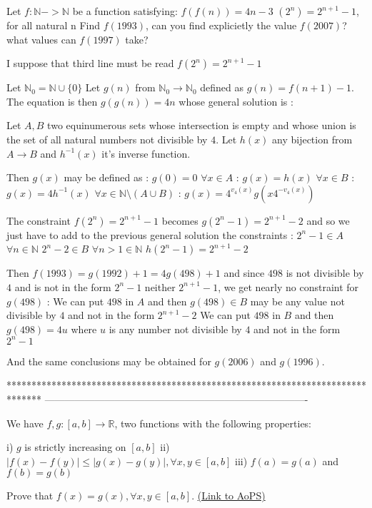 \begin{solution}
	\begin{tcolorbox}Let $f:\mathbb{N}->\mathbb{N}$ be a function satisfying:
 $f(f(n))=4n-3$
 $(2^n)=2^{n+1}-1$, for all natural n
Find $ f(1993)$, can you find explicietly the value $ f(2007)$? what values can $f(1997)$ take?\end{tcolorbox}
I suppose that third line must be read $f(2^n)=2^{n+1}-1$

Let $\mathbb N_0=\mathbb N\cup\{0\}$
Let $g(n)$ from $\mathbb N_0\to\mathbb N_0$ defined as $g(n)=f(n+1)-1$. The equation is then $g(g(n))=4n$ whose general solution is :

Let $A,B$ two equinumerous sets whose intersection is empty and whose union is the set of all natural numbers not divisible by $4$.
Let $h(x)$ any bijection from $A\to B$ and $h^{-1}(x)$ it's inverse function.

Then $g(x)$ may be defined as :
$g(0)=0$
$\forall x\in A$ : $g(x)=h(x)$
$\forall x\in B$ : $g(x)=4h^{-1}(x)$
$\forall x\in\mathbb N\setminus(A\cup B)$ : $g(x)=4^{v_4(x)}g(x4^{-v_4(x)})$


The constraint $f(2^n)=2^{n+1}-1$ becomes $g(2^n-1)=2^{n+1}-2$ and so we just have to add to the previous general solution the constraints :
$2^n-1\in A$ $\forall n\in\mathbb N$
$2^n-2\in B$ $\forall n>1\in\mathbb N$
$h(2^n-1)=2^{n+1}-2$

Then $f(1993)=g(1992)+1=4g(498)+1$ and since $498$ is not divisible by $4$ and is not in the form $2^n-1$ neither $2^{n+1}-1$, we get nearly no constraint for $g(498)$ :
We can put $498$ in $A$ and then $g(498)\in B$ may be any value not divisible by $4$ and not in the form $2^{n+1}-2$
We can put $498$ in $B$ and then $g(498)=4u$ where $u$ is any number not divisible by $4$ and not in the form $2^n-1$

And the same conclusions may be obtained for $g(2006)$ and $g(1996)$.
\end{solution}
*******************************************************************************
-------------------------------------------------------------------------------

\begin{problem}
	We have $f,g : [a,b] \rightarrow \mathbb{R}$, two functions with the following properties:

i) $g$ is strictly increasing on $[a,b]$
ii) $|f(x) - f(y)| \leq |g(x) - g(y)|, \forall x,y \in [a,b]$
iii) $f(a) = g(a)$ and $f(b)=g(b)$

Prove that $f(x) = g(x), \forall x,y \in [a,b]$.
	\flushright \href{https://artofproblemsolving.com/community/c6h401453}{(Link to AoPS)}
\end{problem}



